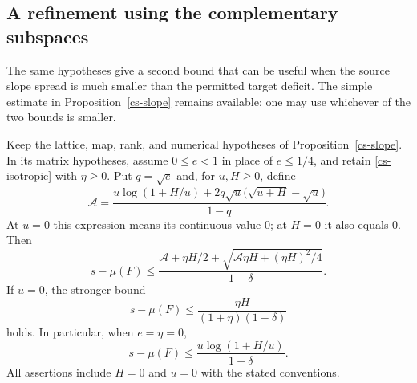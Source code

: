 \subsection{A refinement using the complementary subspaces}
\label{qrh-sharper-slope-section}

The same hypotheses give a second bound that can be useful when the
source slope spread is much smaller than the permitted target deficit.
The simple estimate in Proposition~\ref{cs-slope} remains available;
one may use whichever of the two bounds is smaller.

\begin{proposition}
\label{qrh-sharper-slope}
Keep the lattice, map, rank, and numerical hypotheses of
Proposition~\ref{cs-slope}. In its matrix hypotheses, assume
$0\le e<1$ in place of $e\le1/4$, and retain
\eqref{cs-isotropic} with $\eta\ge0$.
Put $q=\sqrt e$ and, for $u,H\ge0$, define
\[
 \mathcal A=
 \frac{u\log(1+H/u)
       +2q\sqrt u\bigl(\sqrt{u+H}-\sqrt u\bigr)}{1-q}.
\]
At $u=0$ this expression means its continuous value $0$;
at $H=0$ it also equals $0$. Then
\begin{equation}\label{qrh-sharper-slope-bound}
 s-\mu(F)\le
 \frac{\mathcal A+\eta H/2+
       \sqrt{\mathcal A\eta H+(\eta H)^2/4}}{1-\delta}.
\end{equation}
If $u=0$, the stronger bound
\[
 s-\mu(F)\le\frac{\eta H}{(1+\eta)(1-\delta)}
\]
holds. In particular, when $e=\eta=0$,
\begin{equation}\label{qrh-exact-slope-bound}
 s-\mu(F)\le\frac{u\log(1+H/u)}{1-\delta}.
\end{equation}
All assertions include $H=0$ and $u=0$ with the stated conventions.
\end{proposition}

